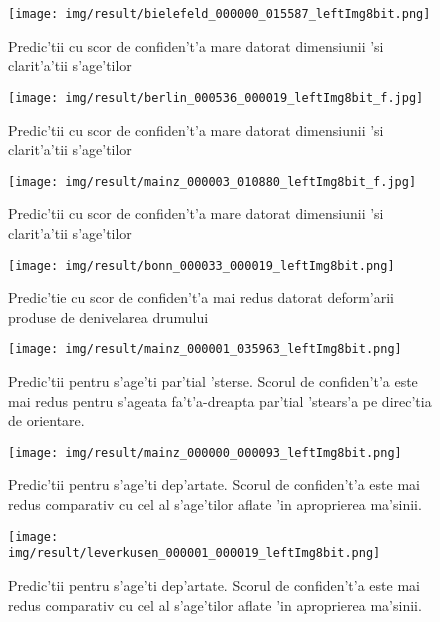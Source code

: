 \documentclass[12pt,a4paper,twoside]{report}
\begin{document}
\begin{figure}[H]
  \centering
  \texttt{[image: img/result/bielefeld\_000000\_015587\_leftImg8bit.png]}
  \caption{Predic'tii cu scor de confiden't'a mare datorat dimensiunii 'si clarit'a'tii s'age'tilor}
\end{figure}

\begin{figure}[H]
  \centering
  \texttt{[image: img/result/berlin\_000536\_000019\_leftImg8bit\_f.jpg]}
    \caption{Predic'tii cu scor de confiden't'a mare datorat dimensiunii 'si clarit'a'tii s'age'tilor}
\end{figure}

\begin{figure}[H]
  \centering
  \texttt{[image: img/result/mainz\_000003\_010880\_leftImg8bit\_f.jpg]}
   \caption{Predic'tii cu scor de confiden't'a mare datorat dimensiunii 'si clarit'a'tii s'age'tilor}
\end{figure}

\begin{figure}[H]
  \centering
  \texttt{[image: img/result/bonn\_000033\_000019\_leftImg8bit.png]}
  \caption{Predic'tie cu scor de confiden't'a mai redus datorat deform'arii produse de denivelarea drumului}
\end{figure}

\begin{figure}[H]
  \centering
  \texttt{[image: img/result/mainz\_000001\_035963\_leftImg8bit.png]}
  \caption{Predic'tii pentru s'age'ti par'tial 'sterse. Scorul de confiden't'a este mai redus pentru s'ageata fa't'a-dreapta par'tial 'stears'a pe direc'tia de orientare.}
\end{figure}

\begin{figure}[H]
  \centering
  \texttt{[image: img/result/mainz\_000000\_000093\_leftImg8bit.png]}
  \caption{Predic'tii pentru s'age'ti dep'artate. Scorul de confiden't'a este mai redus comparativ cu cel al s'age'tilor aflate 'in aproprierea ma'sinii.}
\end{figure}


\begin{figure}[H]
  \centering
  \texttt{[image: img/result/leverkusen\_000001\_000019\_leftImg8bit.png]}
  \caption{Predic'tii pentru s'age'ti dep'artate. Scorul de confiden't'a este mai redus comparativ cu cel al s'age'tilor aflate 'in aproprierea ma'sinii.}
\end{figure}
\end{document}
